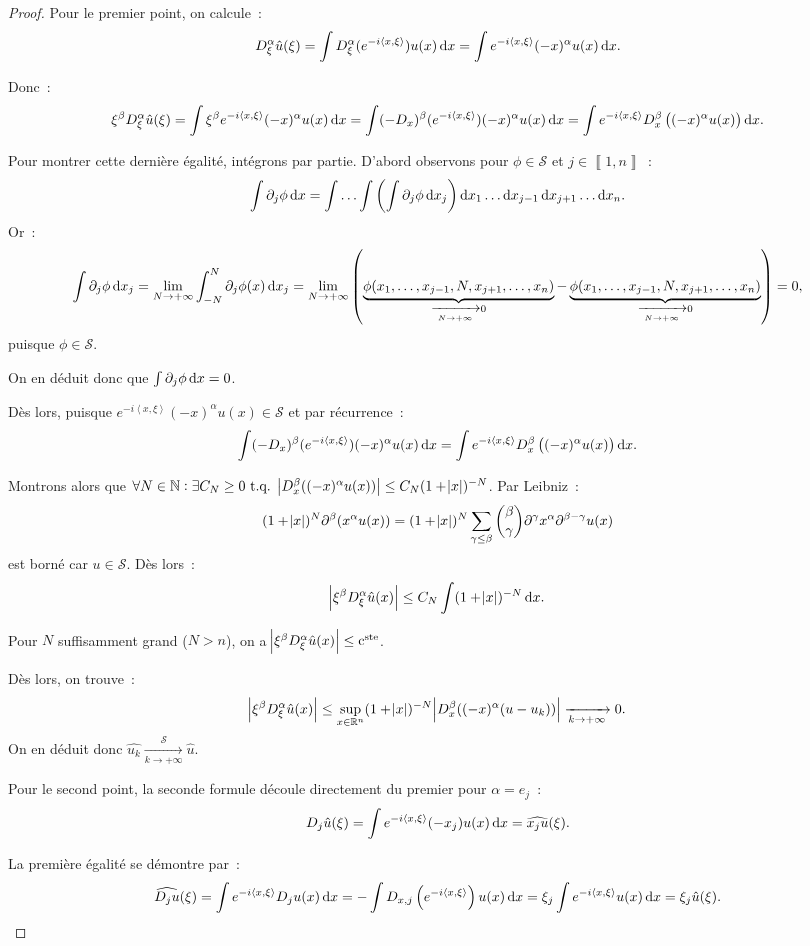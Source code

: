\documentclass{report}
\newcommand{\R}{{\mathbb R}}
\newcommand{\N}{{\mathbb N}}
\newcommand{\scpr}[2]{\left\langle#1, #2\right\rangle}
\newcommand{\tq}{\text{ t.q. }}
\newcommand{\pinfty}{{+\infty}}
\newcommand{\intint}[2]{{\left\llbracket#1, #2\right\rrbracket}}
\newcommand{\cste}{\text{c}^{\text{ste}}}
\newcommand{\dx}{\dif x}
\theoremstyle{definition}
\theoremstyle{remark}
\begin{document}
\begin{proof} Pour le premier point, on calcule~:
\[D^\alpha_\xi\hat u(\xi) = \int D^\alpha_\xi(e^{-i\scpr x\xi})u(x)\dif x = \int e^{-i\scpr x\xi}(-x)^\alpha u(x)\dif x.\]

Donc~:
\[\xi^\beta D^\alpha_\xi\hat u(\xi) = \int \xi^\beta e^{-i\scpr x\xi}(-x)^\alpha u(x)\dif x = \int (-D_x)^\beta(e^{-i\scpr x\xi})(-x)^\alpha u(x)\dif x
	= \int e^{-i\scpr x\xi} D^\beta_x\left((-x)^\alpha u(x)\right)\dif x.\]

Pour montrer cette dernière égalité, intégrons par partie. D'abord observons pour $\phi \in \mathcal S$ et $j \in \intint 1n$~:
\[\int \partial_j\phi\dx = \int\ldots\int\left(\int \partial_j\phi\dx_j\right)\dx_1\ldots\dx_{j-1}\dx_{j+1}\ldots\dx_n.\]
Or~:
\[\int \partial_j\phi\dx_j = \lim_{N \to \pinfty}\int_{-N}^N\partial_j\phi(x)\dx_j
	= \lim_{N \to \pinfty}\left(\underbrace {\phi(x_1, \ldots, x_{j-1}, N, x_{j+1}, \ldots, x_n)}_{\xrightarrow[N \to \pinfty]{} 0} - \underbrace {\phi(x_1, \ldots, x_{j-1}, N, x_{j+1}, \ldots, x_n)}_{\xrightarrow[N \to \pinfty]{} 0}\right) = 0,\]
puisque $\phi \in \mathcal S$.

On en déduit donc que $\int\partial_j\phi\dx = 0$.

Dès lors, puisque $e^{-i\scpr x\xi}(-x)^\alpha u(x) \in \mathcal S$ et par récurrence~:
\[\int (-D_x)^\beta(e^{-i\scpr x\xi})(-x)^\alpha u(x)\dif x	= \int e^{-i\scpr x\xi} D^\beta_x\left((-x)^\alpha u(x)\right)\dif x.\]

Montrons alors que $\forall N \in \N : \exists C_N \geq 0 \tq \abs {D_x^\beta((-x)^\alpha u(x))} \leq C_N(1 + \abs x)^{-N}$. Par Leibniz~:
\[(1 + \abs x)^N\partial^\beta (x^\alpha u(x)) = (1 + \abs x)^N\sum_{\gamma \leq \beta} \binom \beta\gamma\partial^\gamma x^\alpha\partial^{\beta-\gamma}u(x)\]
est borné car $u \in \mathcal S$. Dès lors~:
\[\abs {\xi^\beta D_\xi^\alpha \hat u(x)} \leq C_N\int(1 + \abs x)^{-N}\dx.\]

Pour $N$ suffisamment grand ($N > n$), on a $\abs {\xi^\beta D_\xi^\alpha \hat u(x)} \leq \cste$.

Dès lors, on trouve~:
\[\abs {\xi^\beta D_\xi^\alpha\hat u(x)} \leq \sup_{x \in \R^n}(1 + \abs x)^{-N}\abs {D_x^\beta((-x)^\alpha(u - u_k))} \xrightarrow[k \to \pinfty]{} 0.\]
On en déduit donc $\hat {u_k} \xrightarrow[k \to \pinfty]{\mathcal S} \hat u$.

Pour le second point, la seconde formule découle directement du premier pour $\alpha = e_j$~:
\[D_j\hat u(\xi) = \int e^{-i\scpr x\xi}(-x_j)u(x)\dx = \widehat {x_ju}(\xi).\]

La première égalité se démontre par~:
\[\widehat {D_ju}(\xi) = \int e^{-i\scpr x\xi} D_ju(x)\dx = -\int D_{x,j}\left(e^{-i\scpr x\xi}\right)u(x)\dx = \xi_j\int e^{-i\scpr x\xi}u(x)\dx = \xi_j\hat u(\xi).\]
\end{proof}
\end{document}
